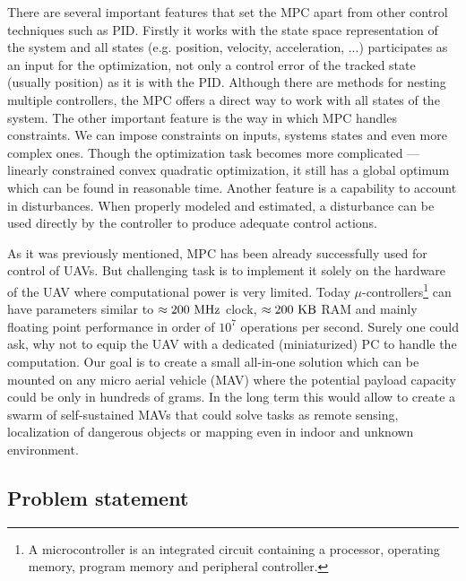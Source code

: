 There are several important features that set the MPC apart from other control techniques such as PID. Firstly it works with the state space representation of the system and all states (e.g. position, velocity, acceleration, ...) participates as an input for the optimization, not only a control error of the tracked state (usually position) as it is with the PID. Although there are methods for nesting multiple controllers, the MPC offers a direct way to work with all states of the system. The other important feature is the way in which MPC handles constraints. We can impose constraints on inputs, systems states and even more complex ones. Though the optimization task becomes more complicated --- linearly constrained convex quadratic optimization, it still has a global optimum which can be found in reasonable time. Another feature is a capability to account in disturbances. When properly modeled and estimated, a disturbance can be used directly by the controller to produce adequate control actions.

As it was previously mentioned, MPC has been already successfully used for control of UAVs. But challenging task is to implement it solely on the hardware of the UAV where computational power is very limited. Today $\mu$-controllers\footnote{A microcontroller is an integrated circuit containing a processor, operating memory, program memory and peripheral controller.} can have parameters similar to $\approx 200 ~\mathrm{MHz}$ clock, $\approx 200 ~\mathrm{KB}$ RAM and mainly floating point performance in order of $10^7$ operations per second. Surely one could ask, why not to equip the UAV with a dedicated (miniaturized) PC to handle the computation. Our goal is to create a small all-in-one solution which can be mounted on any micro aerial vehicle (MAV) where the potential payload capacity could be only in hundreds of grams. In the long term this would allow to create a swarm of self-sustained MAVs that could solve tasks as remote sensing, localization of dangerous objects or mapping even in indoor and unknown environment.

\subsection{Problem statement}

